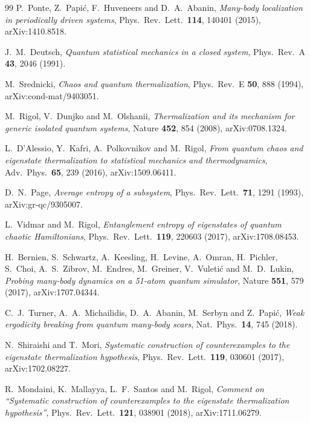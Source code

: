 \begin{thebibliography}{99}
 P.~Ponte, Z.~Papi\'c, F.~Huveneers and D.~A.~Abanin,
  \emph{Many-body localization in periodically driven systems},
  Phys.\ Rev.\ Lett.\ \textbf{114}, 140401 (2015), arXiv:1410.8518.

 J.~M.~Deutsch,
  \emph{Quantum statistical mechanics in a closed system},
  Phys.\ Rev.\ A \textbf{43}, 2046 (1991).

 M.~Srednicki, \emph{Chaos and quantum thermalization},
  Phys.\ Rev.\ E \textbf{50}, 888 (1994), arXiv:cond-mat/9403051.

 M.~Rigol, V.~Dunjko and M.~Olshanii,
  \emph{Thermalization and its mechanism for generic isolated quantum systems},
  Nature \textbf{452}, 854 (2008), arXiv:0708.1324.

 L.~D'Alessio, Y.~Kafri, A.~Polkovnikov and M.~Rigol,
  \emph{From quantum chaos and eigenstate thermalization to statistical
  mechanics and thermodynamics}, Adv.\ Phys.\ \textbf{65}, 239 (2016),
  arXiv:1509.06411.

 D.~N.~Page, \emph{Average entropy of a subsystem},
  Phys.\ Rev.\ Lett.\ \textbf{71}, 1291 (1993), arXiv:gr-qc/9305007.

 L.~Vidmar and M.~Rigol,
  \emph{Entanglement entropy of eigenstates of quantum chaotic Hamiltonians},
  Phys.\ Rev.\ Lett.\ \textbf{119}, 220603 (2017), arXiv:1708.08453.

 H.~Bernien, S.~Schwartz, A.~Keesling, H.~Levine,
  A.~Omran, H.~Pichler, S.~Choi, A.~S.~Zibrov, M.~Endres, M.~Greiner,
  V.~Vuleti\'c and M.~D.~Lukin,
  \emph{Probing many-body dynamics on a 51-atom quantum simulator},
  Nature \textbf{551}, 579 (2017), arXiv:1707.04344.

 C.~J.~Turner, A.~A.~Michailidis, D.~A.~Abanin,
  M.~Serbyn and Z.~Papi\'c,
  \emph{Weak ergodicity breaking from quantum many-body scars},
  Nat.\ Phys.\ \textbf{14}, 745 (2018).

 N.~Shiraishi and T.~Mori,
  \emph{Systematic construction of counterexamples to the eigenstate
  thermalization hypothesis}, Phys.\ Rev.\ Lett.\ \textbf{119}, 030601 (2017),
  arXiv:1702.08227.

 R.~Mondaini, K.~Mallayya, L.~F.~Santos and M.~Rigol,
  \emph{Comment on ``Systematic construction of counterexamples to the
  eigenstate thermalization hypothesis''}, Phys.\ Rev.\ Lett.\ \textbf{121},
  038901 (2018), arXiv:1711.06279.


\end{thebibliography}
